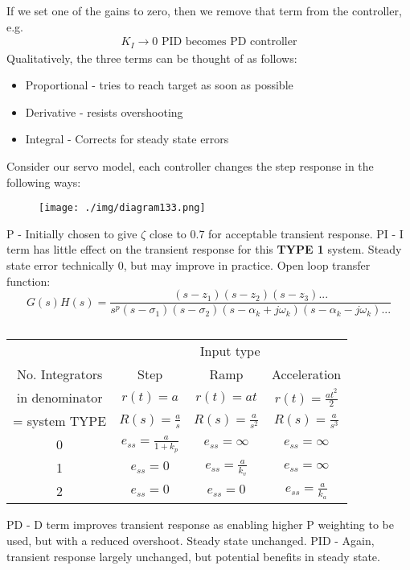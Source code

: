 If we set one of the gains to zero, then we remove that term from the controller, e.g.
\begin{align}
  K_I \rightarrow 0 \textrm{ PID becomes PD controller}
\end{align}
Qualitatively, the three terms can be thought of as follows:
\begin{itemize}
  \item Proportional - tries to reach target as soon as possible
  \item Derivative - resists overshooting
  \item Integral - Corrects for steady state errors
\end{itemize}
Consider our servo model, each controller changes the step response in the following ways:
\begin{figure}[H]
  \centerline{\texttt{[image: ./img/diagram133.png]}}
  \caption{}
\end{figure}
P - Initially chosen to give $\zeta$ close to 0.7 for acceptable transient response. PI - I term has little effect on the transient response for this \textbf{TYPE 1} system. Steady state error technically 0, but may improve in practice. Open loop transfer function:
\begin{equation}
  G(s)H(s) = \frac{\left(s-z_1\right) \left(s-z_2\right) \left(s-z_3\right)...}{s^p \left(s-\sigma_1\right) \left(s-\sigma_2\right) \left(s-\alpha_k + j \omega_k\right) \left(s- \alpha_k - j \omega_k\right)...}
\end{equation}
\begin{table}[H]
  \begin{center}
    \begin{tabular}{|c|c|c|c|}
      \hline
                      & \multicolumn{3}{c|}{Input type}                                                       \\
      \cline{2-4}
      No. Integrators & Step                            & Ramp                     & Acceleration             \\
      in denominator  & $r(t) = a$                      & $r(t) = at$              & $r(t) = \frac{at^2}{2}$  \\
      = system TYPE   & $R(s) = \frac{a}{s}$            & $R(s) = \frac{a}{s^2}$   & $R(s) = \frac{a}{s^3}$   \\
      \hline
      \hline
      0               & $e_{ss} = \frac{a}{1+k_p}$      & $e_{ss} = \infty$        & $e_{ss} = \infty$        \\
      \hline
      1               & $e_{ss} = 0$                    & $e_{ss} = \frac{a}{k_v}$ & $e_{ss} = \infty$        \\
      \hline
      2               & $e_{ss} = 0$                    & $e_{ss} = 0$             & $e_{ss} = \frac{a}{k_a}$ \\
      \hline
    \end{tabular}
  \end{center}
  \caption{}
\end{table}
PD - D term improves transient response as enabling higher P weighting to be used, but with a reduced overshoot. Steady state unchanged. PID - Again, transient response largely unchanged, but potential benefits in steady state.
